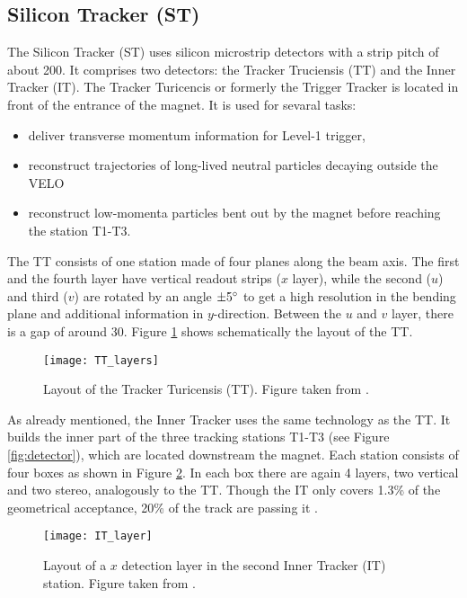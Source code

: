 \subsection{Silicon Tracker (ST)}
The Silicon Tracker (ST) uses silicon microstrip detectors with a strip pitch of about 200\mum.
It comprises two detectors: the Tracker Truciensis (TT) and the Inner Tracker (IT).
The Tracker Turicencis or formerly the Trigger Tracker is located in front of the entrance of the \lhcb magnet. 
It is used for sevaral tasks:
\begin{itemize}
    \item deliver transverse momentum information for Level-1 trigger,
    \item reconstruct trajectories of long-lived neutral particles decaying outside the VELO
    \item reconstruct low-momenta particles bent out by the magnet before reaching the station T1-T3.
\end{itemize}
The TT consists of one station made of four planes along the beam axis. 
The first and the fourth layer have vertical readout strips ($x$ layer), while the second ($u$) and third ($v$) are rotated by an angle $\pm 5^{\circ}$ to get a high resolution in the bending plane and additional information in $y$-direction.
Between the $u$ and $v$ layer, there is a gap of around 30\cm. 
Figure \ref{fig:TT_layers} shows schematically the layout of the TT.
\begin{figure}[tb]
    \centering
	\texttt{[image: TT\_layers]}	
	\caption{Layout of the Tracker Turicensis (TT). 
             Figure taken from \cite{ST_Performance}.}
	\label{fig:TT_layers}
\end{figure}
As already mentioned, the Inner Tracker uses the same technology as the TT. 
It builds the inner part of the three tracking stations T1-T3 (see Figure \ref{fig:detector}), which are located downstream the magnet.
Each station consists of four boxes as shown in Figure \ref{fig:IT_layer}.
In each box there are again 4 layers, two vertical and two stereo, analogously to the TT. 
Though the IT only covers 1.3\% of the geometrical acceptance, 20\% of the track are passing it \cite{detector, ST_Performance}.
\begin{figure}[tb]
    \centering
	\texttt{[image: IT\_layer]}	
	\caption{Layout of a $x$ detection layer in the second Inner Tracker (IT) station. 
             Figure taken from \cite{detector}.}
	\label{fig:IT_layer}
\end{figure}

